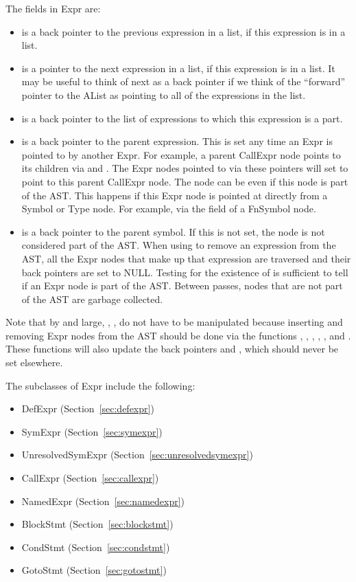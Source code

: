 \documentclass[10pt]{article}
\begin{document}
The fields in Expr are:
\begin{itemize}
\item {} is a back pointer to the previous expression in
  a list, if this expression is in a list.
\item {} is a pointer to the next expression in a list,
  if this expression is in a list.  It may be useful to think of next
  as a back pointer if we think of the ``forward'' pointer to the
  AList as pointing to all of the expressions in the list.
\item {} is a back pointer to the list of expressions to
  which this expression is a part.
\item {} is a back pointer to the parent
  expression.  This is set any time an Expr is pointed to by another
  Expr.  For example, a parent CallExpr node points to its children
  via  and .  The Expr nodes pointed to via
  these pointers will set  to point to this parent
  CallExpr node.  The  node can be  even if
  this node is part of the AST.  This happens if this Expr node is
  pointed at directly from a Symbol or Type node.  For example, via
  the  field of a FnSymbol node.
\item {} is a back pointer to the parent
  symbol.  If this is not set, the node is not considered part of the
  AST.  When using  to remove an expression from the AST,
  all the Expr nodes that make up that expression are traversed and
  their  back pointers are set to NULL.  Testing for
  the existence of  is sufficient to tell if an Expr
  node is part of the AST.  Between passes, nodes that are not part of
  the AST are garbage collected.
\end{itemize}

Note that by and large, , ,  do not have to
be manipulated because inserting and removing Expr nodes from the AST
should be done via the functions , ,
, , , and .
These functions will also update the back pointers  and
, which should never be set elsewhere.

The subclasses of Expr include the following:
\begin{itemize}
\item DefExpr (Section~\ref{sec:defexpr})
\item SymExpr (Section~\ref{sec:symexpr})
\item UnresolvedSymExpr (Section~\ref{sec:unresolvedsymexpr})
\item CallExpr (Section~\ref{sec:callexpr})
\item NamedExpr (Section~\ref{sec:namedexpr})
\item BlockStmt (Section~\ref{sec:blockstmt})
\item CondStmt (Section~\ref{sec:condstmt})
\item GotoStmt (Section~\ref{sec:gotostmt})
\end{itemize}
\end{document}
